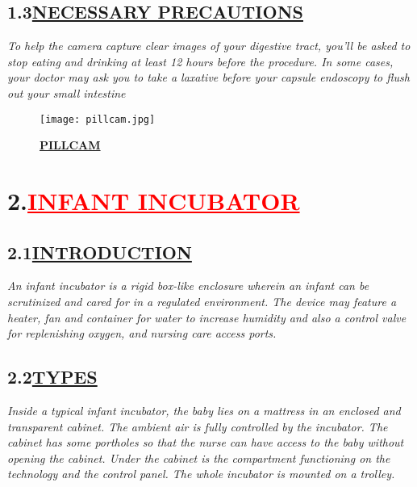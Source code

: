 \documentclass[12pt]{article}
\begin{document}
\subsection*{\hspace{1cm}\textbf{\huge{1.3\hspace{1cm}\underline{NECESSARY PRECAUTIONS}}}}
\hspace{2cm}\large{\emph{To help the camera capture clear images of your digestive tract, you'll be asked to stop eating and drinking at least 12 hours before the procedure. In some cases, your doctor may ask you to take a laxative before your capsule endoscopy to flush out your small intestine}}

\begin{figure}
    \centering
    \texttt{[image: pillcam.jpg]}
    \caption{\textbf{\underline{PILLCAM}}}
    \label{fig:1}
\end{figure}

\newpage
\section*{\textbf{2.\hspace{1cm}\textcolor{red}{\underline{\huge{INFANT INCUBATOR}}}}}
\vspace{1cm}
\subsection*{\hspace{1cm}\textbf{2.1\hspace{1cm}\underline{\LARGE{INTRODUCTION}}}}
\hspace{1cm}\LARGE{\emph{An infant incubator is a rigid box-like enclosure wherein an infant can be scrutinized and cared for in a regulated environment. The device may feature a heater, fan and container for water to increase humidity and also a control valve for replenishing oxygen, and nursing care access ports.}}
\vspace{1cm}
\subsection*{\hspace{1cm}\textbf{2.2\hspace{1cm}\underline{\LARGE{TYPES}}}}
\vspace{1cm}
\hspace{2cm}\large{\emph{Inside a typical infant incubator, the baby lies on a mattress in an enclosed and transparent cabinet. The ambient air is fully controlled by the incubator. The cabinet has some portholes so that the nurse can have access to the baby without opening the cabinet. Under the cabinet is the compartment functioning on the technology and the control panel. The whole incubator is mounted on a trolley.}}
\end{document}
